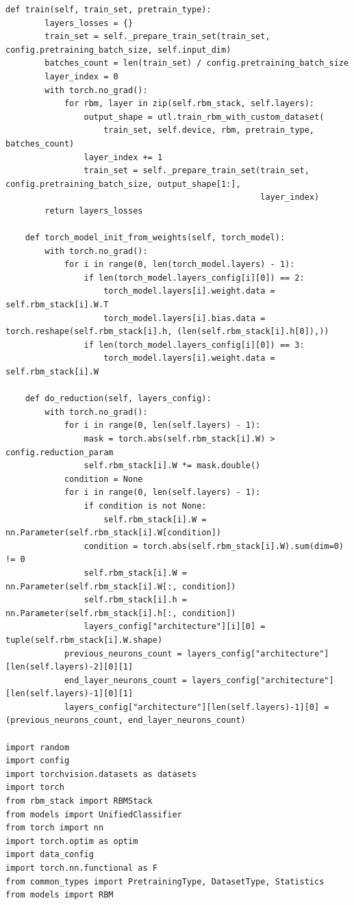 \begin{lstlisting}[style=PythonStyle]
    def train(self, train_set, pretrain_type):
        layers_losses = {}
        train_set = self._prepare_train_set(train_set, config.pretraining_batch_size, self.input_dim)
        batches_count = len(train_set) / config.pretraining_batch_size
        layer_index = 0
        with torch.no_grad():
            for rbm, layer in zip(self.rbm_stack, self.layers):
                output_shape = utl.train_rbm_with_custom_dataset(
                    train_set, self.device, rbm, pretrain_type, batches_count)
                layer_index += 1
                train_set = self._prepare_train_set(train_set, config.pretraining_batch_size, output_shape[1:],
                                                    layer_index)
        return layers_losses

    def torch_model_init_from_weights(self, torch_model):
        with torch.no_grad():
            for i in range(0, len(torch_model.layers) - 1):
                if len(torch_model.layers_config[i][0]) == 2:
                    torch_model.layers[i].weight.data = self.rbm_stack[i].W.T
                    torch_model.layers[i].bias.data = torch.reshape(self.rbm_stack[i].h, (len(self.rbm_stack[i].h[0]),))
                if len(torch_model.layers_config[i][0]) == 3:
                    torch_model.layers[i].weight.data = self.rbm_stack[i].W

    def do_reduction(self, layers_config):
        with torch.no_grad():
            for i in range(0, len(self.layers) - 1):
                mask = torch.abs(self.rbm_stack[i].W) > config.reduction_param
                self.rbm_stack[i].W *= mask.double()
            condition = None
            for i in range(0, len(self.layers) - 1):
                if condition is not None:
                    self.rbm_stack[i].W = nn.Parameter(self.rbm_stack[i].W[condition])
                condition = torch.abs(self.rbm_stack[i].W).sum(dim=0) != 0
                self.rbm_stack[i].W = nn.Parameter(self.rbm_stack[i].W[:, condition])
                self.rbm_stack[i].h = nn.Parameter(self.rbm_stack[i].h[:, condition])
                layers_config["architecture"][i][0] = tuple(self.rbm_stack[i].W.shape)
            previous_neurons_count = layers_config["architecture"][len(self.layers)-2][0][1]
            end_layer_neurons_count = layers_config["architecture"][len(self.layers)-1][0][1]
            layers_config["architecture"][len(self.layers)-1][0] = (previous_neurons_count, end_layer_neurons_count)
            
import random
import config
import torchvision.datasets as datasets
import torch
from rbm_stack import RBMStack
from models import UnifiedClassifier
from torch import nn
import torch.optim as optim
import data_config
import torch.nn.functional as F
from common_types import PretrainingType, DatasetType, Statistics
from models import RBM



\end{lstlisting}
